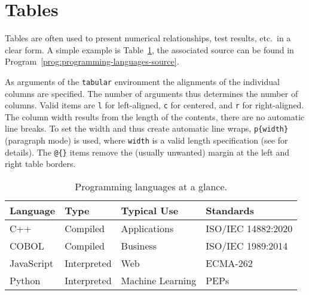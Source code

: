 \section{Tables}
\label{sec:Tables}

Tables are often used to present numerical relationships, test results, etc.\
in a clear form. A simple example is Table~\ref{tab:programming-languages},
the associated \latex source can be found in 
Program~\ref{prog:programming-languages-source}.

As arguments of the \texttt{tabular} environment the alignments of the
individual columns are specified. The number of arguments thus determines the
number of columns. Valid items are \texttt{l} for left-aligned, \texttt{c}
for centered, and \texttt{r} for right-aligned. The column width results from
the length of the contents, there are no automatic line breaks. To set the
width and thus create automatic line wraps, \verb|p{width}| (paragraph mode)
is used, where \texttt{width} is a valid length specification (see
\cite{WikibooksLaTeXLengths2018} for details). The \verb|@{}| items remove
the (usually unwanted) margin at the left and right table borders.

\begin{table}
    \caption{Programming languages at a glance.}
    \label{tab:programming-languages}
    \centering
    \setlength{\tabcolsep}{10pt} 				%
    \renewcommand{\arraystretch}{1.25}	%
    \begin{tabular}{@{}llll@{}}
        \toprule
        Language   & Type        & Typical Use      & Standards          \\
        \midrule
        C++        & Compiled    & Applications     & ISO/IEC 14882:2020 \\
        COBOL      & Compiled    & Business         & ISO/IEC 1989:2014  \\
        JavaScript & Interpreted & Web              & ECMA-262           \\
        Python     & Interpreted & Machine Learning & PEPs               \\
        \bottomrule
    \end{tabular}
\end{table}

